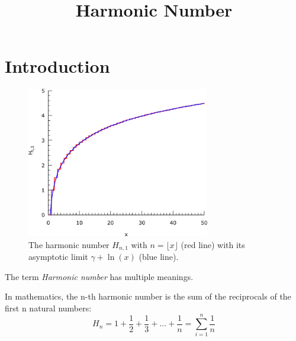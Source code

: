 \documentclass[2pt]{article}
\title{\textbf{Harmonic Number}}
\begin{document}
\date{\vspace{-5ex}}
\maketitle 
\section{Introduction}
\begin{figure}
\includegraphics[width=8cm, natwidth=557, natheight=458]{1.eps}\caption{\small{The harmonic number $H_{n,1}$ with $n=\lfloor{x}\rfloor$ (red line) with its asymptotic limit $\gamma+\ln(x)$ (blue line).}}\end{figure}
\begin{flushleft}
The term \emph{Harmonic number} has multiple meanings.
\end{flushleft}
In mathematics, the n-th harmonic number is the sum of the reciprocals of the first n natural numbers:
\begin{equation}
H_{n}=1+\frac{1}{2}+\frac{1}{3}+...+\frac{1}{n}=\sum_{i=1}^n \frac{1}{n} \label{nth harmonic number}\nonumber
\end{equation}
\end{document}
